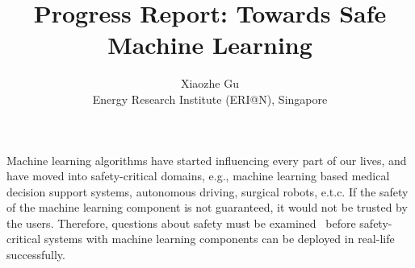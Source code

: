 \documentclass[11pt,onecolumn]{IEEEtran}
\begin{document}
     
\title{Progress Report: Towards Safe Machine Learning}
\author{Xiaozhe Gu\\Energy Research Institute (ERI@N), Singapore }

\maketitle

Machine learning algorithms have started influencing every part of our lives, and  have moved into safety-critical domains, e.g., machine learning based medical decision support systems, autonomous driving, surgical robots, e.t.c.   If the safety of the machine learning component is not guaranteed, it would not be trusted by the users.  Therefore,  questions about safety   must be examined~\cite{safeml} before safety-critical systems with machine learning components can be deployed in real-life successfully. 
\end{document}
